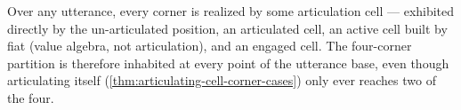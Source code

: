 \begin{proposition}\label{thm:corner-surjective}\leanok{}
Over any utterance, every corner is realized by some articulation cell ---
exhibited directly by the un-articulated position, an articulated cell, an
active cell built by fiat (value algebra, not articulation), and an engaged
cell. The four-corner partition is therefore inhabited at every point of the
utterance base, even though articulating itself (\cref{thm:articulating-cell-corner-cases})
only ever reaches two of the four.
\end{proposition}
